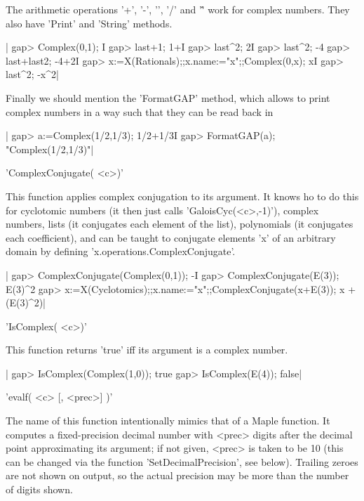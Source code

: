 The arithmetic operations '+', '-', '\*', '/' and '\^' work for complex
numbers. They also have 'Print' and 'String' methods.

|    gap> Complex(0,1);
    I
    gap> last+1;
    1+I
    gap> last^2;
    2I
    gap> last^2;
    -4
    gap> last+last2;
    -4+2I
    gap> x:=X(Rationals);;x.name:="x";;Complex(0,x);
    xI
    gap> last^2;
    -x^2|

Finally  we  should  mention  the  'FormatGAP'  method,  which allows to print
complex numbers in a way such that they can be read back in \GAP\:\

|    gap> a:=Complex(1/2,1/3);
    1/2+1/3I
    gap> FormatGAP(a);
    "Complex(1/2,1/3)"|


'ComplexConjugate( <c>)'

This  function   applies  complex  conjugation  to   its  argument.  It
knows  ho  to do  this  for  cyclotomic  numbers  (it then  just  calls
'GaloisCyc(<c>,-1)'),  complex  numbers,   lists  (it  conjugates  each
element of the list), polynomials (it conjugates each coefficient), and
can  be taught  to conjugate  elements 'x'  of an  arbitrary domain  by
defining 'x.operations.ComplexConjugate'.

|    gap> ComplexConjugate(Complex(0,1));
    -I
    gap> ComplexConjugate(E(3));
    E(3)^2
    gap> x:=X(Cyclotomics);;x.name:="x";;ComplexConjugate(x+E(3));
    x + (E(3)^2)|


'IsComplex( <c>)'

This function returns 'true' iff its argument is a complex number.

|    gap> IsComplex(Complex(1,0));
    true
    gap> IsComplex(E(4));
    false|

%
%

'evalf( <c> [, <prec>] )'

The  name  of  this  function  intentionally mimics  that  of  a  Maple
function.  It computes  a  fixed-precision decimal  number with  <prec>
digits  after the  decimal  point approximating  its  argument; if  not
given, <prec> is taken  to be 10 (this can be  changed via the function
'SetDecimalPrecision',  see below).  Trailing zeroes  are not  shown on
output, so the  actual precision may be more than  the number of digits
shown.

